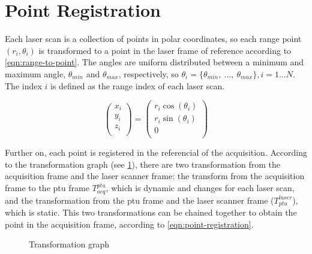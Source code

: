 \section{Point Registration}
\label{section:point-registration}

Each laser scan is a collection of points in polar coordinates, so each range point $(r_i, \theta_i)$ is transformed to a point in the laser frame of reference according to \cref{eqn:range-to-point}. The angles are uniform distributed between a minimum and maximum angle, $\theta_{min}$ and $\theta_{max}$, respectively, so $\theta_i = \{\theta_{min}, \ \dots, \ \theta_{max}\}, i=1 \dots N$. The index $i$ is defined as the range index of each laser scan.

\begin{equation}\label{eqn:range-to-point}
    \left(
        \begin{array}{c}
            x_i \\
            y_i \\
            z_i \\
        \end{array}
    \right)
    =
    \left(
        \begin{array}{c}
            r_i \cos(\theta_i) \\
            r_i \sin(\theta_i) \\
            0 \\
        \end{array}    
    \right)
\end{equation}

Further on, each point is registered in the referencial of the acquisition. According to the transformation graph (see \cref{figure:geometric-transformation-graph}), there are two transformation from the acquisition frame and the laser scanner frame: the transform from the acquisition frame to the ptu frame $T_{acq}^{ptu}$, which is dynamic and changes for each laser scan, and the transformation from the ptu frame and the laser scanner frame ($T_{ptu}^{laser}$), which is static. This two transformations can be chained together to obtain the point in the acquisition frame, according to \cref{eqn:point-registration}.


\begin{figure}
    
    \centering
    
    \caption{Transformation graph}
    \label{figure:geometric-transformation-graph}
\end{figure}

